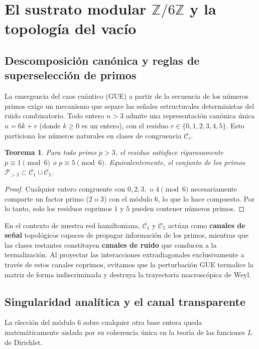 \documentclass[aps,prl,preprint,superscriptaddress,floatfix]{revtex4-2}
\newtheorem{theorem}{Teorema}[section]
\begin{document}
\section{El sustrato modular \texorpdfstring{$\mathbb{Z}/6\mathbb{Z}$}{Z/6Z} y la topología del vacío}

\subsection{Descomposición canónica y reglas de superselección de primos}

La emergencia del caos cuántico (GUE) a partir de la secuencia de los números primos exige un mecanismo que separe las señales estructurales deterministas del ruido combinatorio. Todo entero $n > 3$ admite una representación canónica única $n = 6k + r$ (donde $k \ge 0$ es un entero), con el residuo $r \in \{0,1,2,3,4,5\}$. Esto particiona los números naturales en clases de congruencia $\mathcal{C}_r$. 

\begin{theorem}
Para todo primo $p > 3$, el residuo satisface rigurosamente $p \equiv 1 \pmod 6$ o $p \equiv 5 \pmod 6$. Equivalentemente, el conjunto de los primos $\mathcal{P}_{>3} \subset \mathcal{C}_1 \cup \mathcal{C}_5$.
\end{theorem}

\begin{proof}
Cualquier entero congruente con $0, 2, 3,$ o $4 \pmod 6$ necesariamente comparte un factor primo ($2$ o $3$) con el módulo $6$, lo que lo hace compuesto. Por lo tanto, solo los residuos coprimos $1$ y $5$ pueden contener números primos.
\end{proof}

En el contexto de nuestra red hamiltoniana, $\mathcal{C}_1$ y $\mathcal{C}_5$ actúan como \textbf{canales de señal} topológicos capaces de propagar información de los primos, mientras que las clases restantes constituyen \textbf{canales de ruido} que conducen a la termalización. Al proyectar las interacciones extradiagonales exclusivamente a través de estos canales coprimos, evitamos que la perturbación GUE termalice la matriz de forma indiscriminada y destruya la trayectoria macroscópica de Weyl.

\subsection{Singularidad analítica y el canal transparente}

La elección del módulo 6 sobre cualquier otra base entera queda matemáticamente aislada por su coherencia única en la teoría de las funciones $L$ de Dirichlet.
\end{document}
